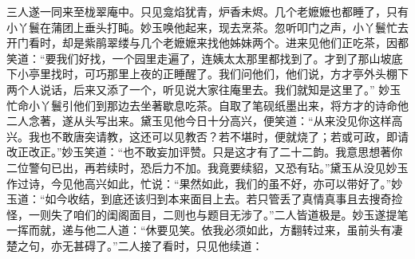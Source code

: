 \begin{parag}
    三人遂一同来至栊翠庵中。只见龛焰犹青，炉香未烬。几个老嬷嬷也都睡了，只有小丫鬟在蒲团上垂头打盹。妙玉唤他起来，现去烹茶。忽听叩门之声，小丫鬟忙去开门看时，却是紫鹃翠缕与几个老嬷嬷来找他姊妹两个。进来见他们正吃茶，因都笑道：“要我们好找，一个园里走遍了，连姨太太那里都找到了。才到了那山坡底下小亭里找时，可巧那里上夜的正睡醒了。我们问他们，他们说，方才亭外头棚下两个人说话，后来又添了一个，听见说大家往庵里去。我们就知是这里了。” 妙玉忙命小丫鬟引他们到那边去坐著歇息吃茶。自取了笔砚纸墨出来，将方才的诗命他二人念著，遂从头写出来。黛玉见他今日十分高兴，便笑道：“从来没见你这样高兴。我也不敢唐突请教，这还可以见教否？若不堪时，便就烧了；若或可政，即请改正改正。”妙玉笑道：“也不敢妄加评赞。只是这才有了二十二韵。我意思想著你二位警句已出，再若续时，恐后力不加。我竟要续貂，又恐有玷。”黛玉从没见妙玉作过诗，今见他高兴如此，忙说：“果然如此，我们的虽不好，亦可以带好了。”妙玉道：“如今收结，到底还该归到本来面目上去。若只管丢了真情真事且去搜奇捡怪，一则失了咱们的闺阁面目，二则也与题目无涉了。”二人皆道极是。妙玉遂提笔一挥而就，递与他二人道：“休要见笑。依我必须如此，方翻转过来，虽前头有凄楚之句，亦无甚碍了。”二人接了看时，只见他续道：
\end{parag}


